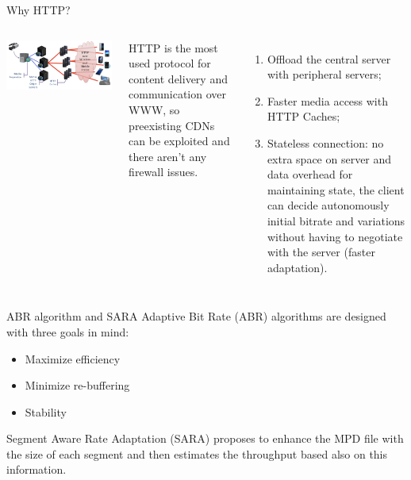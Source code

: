 \documentclass[10pt]{beamer}
\begin{document}
\begin{frame}[fragile]{Why HTTP?}
\begin{columns}
        	\centering
            \includegraphics[width=\textwidth]{img/architecture}
            \vspace*{0.25cm}
            \raggedright HTTP is the most used protocol for content delivery and communication over WWW, so preexisting CDNs can be exploited and there aren't any firewall issues.
        	\begin{enumerate}
            \item Offload the central server with peripheral servers;
            \item Faster media access with HTTP Caches;
            \item Stateless connection: no extra space on server and data overhead for maintaining state, the client can decide autonomously initial bitrate and variations without having to negotiate with the server (faster adaptation).
            \end{enumerate}
\end{columns}
\end{frame}

\begin{frame}[fragile]{ABR algorithm and SARA}
Adaptive Bit Rate (ABR) algorithms are designed with three goals in mind:
\begin{itemize}
\item Maximize efficiency
\item Minimize re-buffering
\item Stability
\end{itemize}
\vfill
Segment Aware Rate Adaptation (SARA) proposes to enhance the MPD file with the size of each segment and then estimates the throughput based also on this information.
\end{frame}
\end{document}
